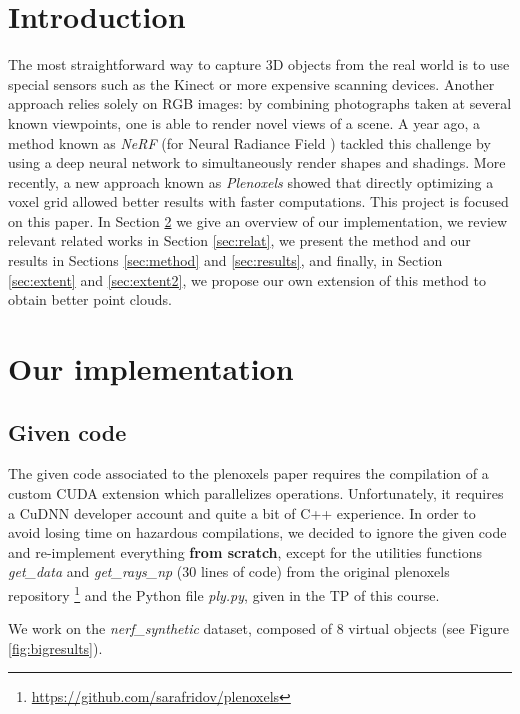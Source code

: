 \documentclass{article}
\begin{document}
\section{Introduction}

The most straightforward way to capture 3D objects from the real world is to use special sensors such as the Kinect or more expensive scanning devices. Another approach relies solely on RGB images: by combining photographs taken at several known viewpoints, one is able to render novel views of a scene. A year ago, a method known as \textit{NeRF} (for Neural Radiance Field \cite{nerf}) tackled this challenge by using a deep neural network to simultaneously render shapes and shadings. More recently, a new approach known as \textit{Plenoxels} \cite{plenoxels} showed that directly optimizing a voxel grid allowed better results with faster computations. This project is focused on this paper. In Section \ref{sec:ourimp} we give an overview of our implementation, we review relevant related works in Section \ref{sec:relat}, we present the method and our results in Sections \ref{sec:method} and \ref{sec:results}, and finally, in Section \ref{sec:extent} and \ref{sec:extent2}, we propose our own extension of this method to obtain better point clouds.

\section{Our implementation}\label{sec:ourimp}

\subsection{Given code}


The given code associated to the plenoxels paper requires the compilation of a custom CUDA extension which parallelizes operations. Unfortunately, it requires a CuDNN developer account and quite a bit of C++ experience. In order to avoid losing time on hazardous compilations, we decided to ignore the given code and re-implement everything \textbf{from scratch}, except for the utilities functions \textit{get\_data} and \textit{get\_rays\_np} (30 lines of code) from the original plenoxels repository \footnote{\url{https://github.com/sarafridov/plenoxels}} and the Python file \textit{ply.py}, given in the TP of this course.  

We work on the \textit{nerf\_synthetic} dataset, composed of 8 virtual objects (see Figure \ref{fig:bigresults}).
\end{document}
